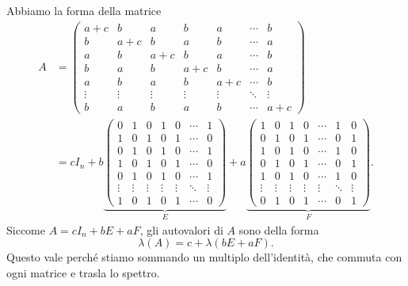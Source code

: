 \documentclass[a4paper]{article}
\begin{document}
\begin{snippetsolution}{}
    Abbiamo la forma della matrice
    \begin{align*}
        A &=
        \begin{pmatrix}
            a+c & b   & a   & b   & a   & \cdots & b \\
            b   & a+c & b   & a   & b   & \cdots & a \\
            a   & b   & a+c & b   & a   & \cdots & b \\
            b   & a   & b   & a+c & b   & \cdots & a \\
            a   & b   & a   & b   & a+c & \cdots & b \\
            \vdots & \vdots & \vdots & \vdots & \vdots & \ddots & \vdots \\
            b   & a   & b   & a   & b   & \cdots & a+c
        \end{pmatrix} \\
        &= cI_n + b \underbrace{
            \begin{pmatrix}
                0 & 1   & 0   & 1   & 0   & \cdots & 1 \\
                1 & 0   & 1   & 0   & 1   & \cdots & 0 \\
                0 & 1   & 0   & 1   & 0   & \cdots & 1 \\
                1 & 0   & 1   & 0   & 1   & \cdots & 0 \\
                0 & 1   & 0   & 1   & 0   & \cdots & 1 \\
                \vdots & \vdots & \vdots & \vdots & \vdots & \ddots & \vdots \\
                1 & 0   & 1   & 0   & 1   & \cdots & 0
        \end{pmatrix}}_{E}
        + a \underbrace{
            \begin{pmatrix}
                1 & 0   & 1   & 0   & \cdots & 1 & 0 \\
                0 & 1   & 0   & 1   & \cdots & 0 & 1 \\
                1 & 0   & 1   & 0   & \cdots & 1 & 0 \\
                0 & 1   & 0   & 1   & \cdots & 0 & 1 \\
                1 & 0   & 1   & 0   & \cdots & 1 & 0 \\
                \vdots & \vdots & \vdots & \vdots & \vdots & \ddots & \vdots \\
                0 & 1   & 0   & 1   & \cdots & 0 & 1
        \end{pmatrix}}_{F}.
    \end{align*}
    Siccome \(A = cI_n + bE + aF\), gli autovalori di \(A\) sono della forma
    \[
        \lambda(A) = c + \lambda(bE+aF).
    \]
    Questo vale perché stiamo sommando un multiplo dell'identità, che commuta
    con ogni matrice e trasla lo spettro.


\end{snippetsolution}
\end{document}

